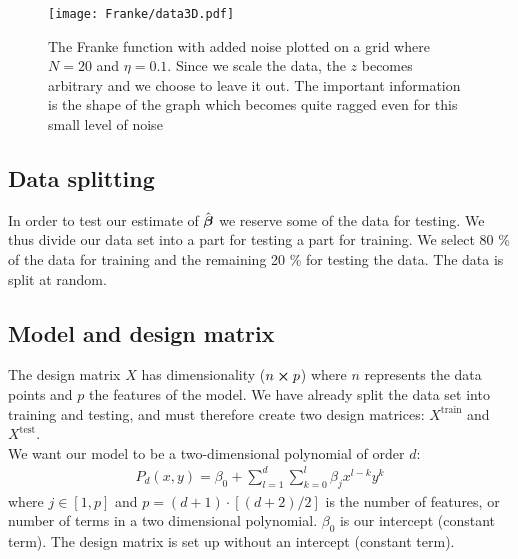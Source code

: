         \begin{figure}
            \texttt{[image: Franke/data3D.pdf]}
            \caption{The Franke function with added noise plotted on a grid where $N=20$ and $\eta=0.1$. Since we scale the data, the $z$ becomes arbitrary and we choose to leave it out. The important information is the shape of the graph which becomes quite ragged even for this small level of noise}
            \label{fig:franke_function_noise}
        \end{figure}

    \subsection{Data splitting}\label{sec:splitting}
        In order to test our estimate of $\hat{\boldsymbol{\beta}}$ we reserve some of the data for testing. We thus divide our data set into a part for testing a part for training. We select 80 \% of the data for training and the remaining 20 \% for testing the data. The data is split at random. 




    \subsection{Model and design matrix}\label{sec:model}
        The design matrix $X$ has dimensionality ($n\cross p$) where $n$ represents the data points and $p$ the features of the model. We have already split the data set into training and testing, and must therefore create two design matrices: $X^{\text{train}}$ and $X^{\text{test}}$. 
        \\
        We want our model to be a two-dimensional polynomial of order $d$:
        \begin{align*}
            P_d(x,y) = \beta_0 + \sum_{l=1}^d\sum_{k=0}^{l} \beta_jx^{l-k}y^k
        \end{align*}
        where $j\in[1,p]$ and $p=(d+1)\cdot\left[(d+2)/2\right]$ is the number of features, or number of terms in a two dimensional polynomial. $\beta_0$ is our intercept (constant term). The design matrix is set up without an intercept (constant term). 





    
